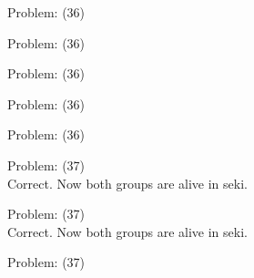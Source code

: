 \documentclass[11pt]{article}
\begin{document}
\begin{minipage}[t]{0.5\textwidth}
  {\centering
  
  Problem: (36)\\
  
  }
\end{minipage}
\begin{minipage}[t]{0.5\textwidth}
  {\centering
  
  Problem: (36)\\
  
  }
\end{minipage}
\begin{minipage}[t]{0.5\textwidth}
  {\centering
  
  Problem: (36)\\
  
  }
\end{minipage}
\begin{minipage}[t]{0.5\textwidth}
  {\centering
  
  Problem: (36)\\
  
  }
\end{minipage}
\begin{minipage}[t]{0.5\textwidth}
  {\centering
  
  Problem: (36)\\
  
  }
\end{minipage}
\begin{minipage}[t]{0.5\textwidth}
  {\centering
  
  Problem: (37)\\
  Correct. Now both groups are alive in seki.\\
  }
\end{minipage}
\begin{minipage}[t]{0.5\textwidth}
  {\centering
  
  Problem: (37)\\
  Correct. Now both groups are alive in seki.\\
  }
\end{minipage}
\begin{minipage}[t]{0.5\textwidth}
  {\centering
  
  Problem: (37)\\
  
  }
\end{minipage}
\end{document}
